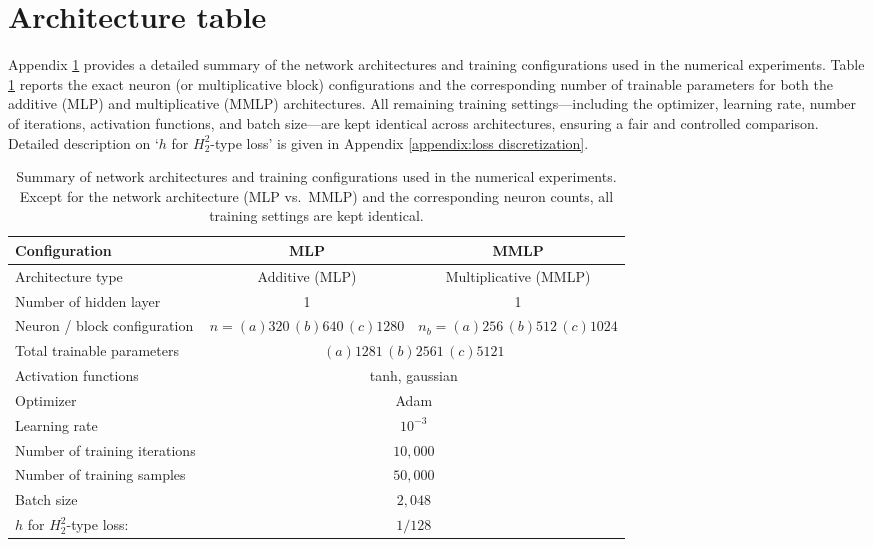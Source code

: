 \documentclass[11pt,reqno]{amsart}
\numberwithin{equation}{section}
\theoremstyle{remark}
\theoremstyle{definition}
\def \H {H^2_2}
\begin{document}
\appendix
\section{Architecture table}
\label{appendix:architecture}

Appendix \ref{appendix:architecture} provides a detailed summary of the network architectures and training configurations used in the numerical experiments. Table \ref{tab:arch_config} reports the exact neuron (or multiplicative block) configurations and the corresponding number of trainable parameters for both the additive (MLP) and multiplicative (MMLP) architectures.
All remaining training settings—including the optimizer, learning rate, number of iterations, activation functions, and batch size—are kept identical across architectures, ensuring a fair and controlled comparison. Detailed description on `$h$ for $\H$-type loss' is given in Appendix \ref{appendix:loss discretization}. 

\begin{table}[ht]\centering
\label{tab:arch_config}
\begin{tabular}{lcc}
\hline
\textbf{Configuration} 
& \textbf{MLP} 
& \textbf{MMLP} \\
\hline
Architecture type 
& Additive (MLP) 
& Multiplicative (MMLP) \\

Number of hidden layer
& 1 & 1\\

Neuron / block configuration 
& $n = (a) 320 \, (b) 640 \, (c)1280$ 
& $n_b = (a)256 \, (b)512 \, (c)1024$ \\

Total trainable parameters 
&  \multicolumn{2}{c}{$(a) 1281 \, (b) 2561 \, (c) 5121$}\\

Activation functions 
& \multicolumn{2}{c}{tanh, gaussian} \\

Optimizer 
& \multicolumn{2}{c}{Adam} \\

Learning rate 
& \multicolumn{2}{c}{$10^{-3}$} \\

Number of training iterations 
& \multicolumn{2}{c}{$10{,}000$} \\

Number of training samples
& \multicolumn{2}{c}{$50{,}000$} \\

Batch size 
& \multicolumn{2}{c}{$2{,}048$} \\

$h$ for $\H$-type loss:   
& \multicolumn{2}{c}{$1/128$} \\
\hline
\end{tabular}
\caption{Summary of network architectures and training configurations used in the numerical experiments. 
Except for the network architecture (MLP vs.\ MMLP) and the corresponding neuron counts, all training settings are kept identical.}
\end{table}
\end{document}
